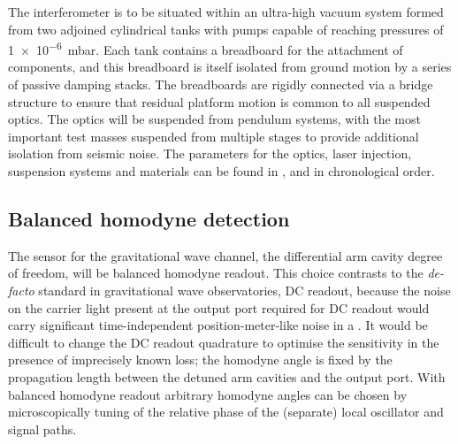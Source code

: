 The interferometer is to be situated within an ultra-high vacuum system formed from two adjoined cylindrical tanks with pumps capable of reaching pressures of \SI{1e-6}{\milli\bar}. Each tank contains a breadboard for the attachment of components, and this breadboard is itself isolated from ground motion by a series of passive damping stacks. The breadboards are rigidly connected via a bridge structure to ensure that residual platform motion is common to all suspended optics. The optics will be suspended from pendulum systems, with the most important test masses suspended from multiple stages to provide additional isolation from seismic noise. The parameters for the optics, laser injection, suspension systems and materials can be found in \cite{Graef2014}, \cite{Danilishin2015} and \cite{Leavey2016} in chronological order.

\subsection{\label{sec:bhd-intro}Balanced homodyne detection}
The sensor for the gravitational wave channel, the differential arm cavity degree of freedom, will be balanced homodyne readout. This choice contrasts to the \emph{de-facto} standard in gravitational wave observatories, \gls{DC} readout, because the noise on the carrier light present at the output port required for \gls{DC} readout would carry significant time-independent position-meter-like noise in a \SSM{}. It would be difficult to change the \gls{DC} readout quadrature to optimise the sensitivity in the presence of imprecisely known loss; the homodyne angle is fixed by the propagation length between the detuned arm cavities and the output port. With balanced homodyne readout arbitrary homodyne angles can be chosen by microscopically tuning of the relative phase of the (separate) local oscillator and signal paths.

